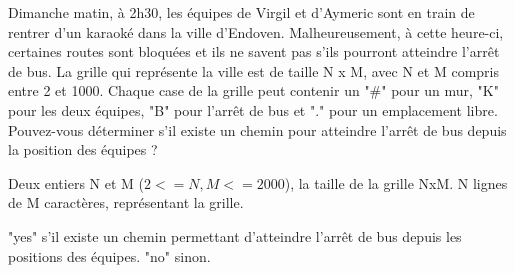 \problemname{\problemyamlname}


Dimanche matin, à 2h30, les équipes de Virgil et d'Aymeric sont en train de rentrer d'un karaoké dans la ville d'Endoven.
Malheureusement, à cette heure-ci, certaines routes sont bloquées et ils ne savent pas s'ils pourront atteindre l'arrêt de bus. 
La grille qui représente la ville est de taille N x M, avec N et M compris entre 2 et 1000.
Chaque case de la grille peut contenir un "\#" pour un mur, "K" pour les deux équipes, "B" pour l'arrêt de bus et "." pour un emplacement libre.
Pouvez-vous déterminer s'il existe un chemin pour atteindre l'arrêt de bus depuis la position des équipes ?

\begin{Input}
    Deux entiers N et M ($2 <= N, M <= 2000$), la taille de la grille NxM.
    N lignes de M caractères, représentant la grille.
\end{Input}

\begin{Output}
    "yes" s'il existe un chemin permettant d'atteindre l'arrêt de bus depuis les positions des équipes.
    "no" sinon.
\end{Output}
